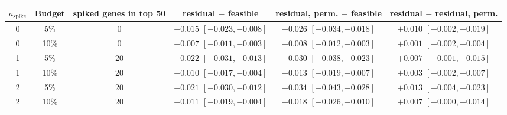 \begin{tabular}{cccccc}
\toprule
$a_{\mathrm{spike}}$ & Budget & spiked genes in top 50 & residual $-$ feasible & residual, perm. $-$ feasible & residual $-$ residual, perm. \\
\midrule
0 & 5\% & 0 & $-0.015$ $[-0.023, -0.008]$ & $-0.026$ $[-0.034, -0.018]$ & ${+}0.010$ $[{+}0.002, {+}0.019]$ \\
0 & 10\% & 0 & $-0.007$ $[-0.011, -0.003]$ & $-0.008$ $[-0.012, -0.003]$ & ${+}0.001$ $[-0.002, {+}0.004]$ \\
1 & 5\% & 20 & $-0.022$ $[-0.031, -0.013]$ & $-0.030$ $[-0.038, -0.023]$ & ${+}0.007$ $[-0.001, {+}0.015]$ \\
1 & 10\% & 20 & $-0.010$ $[-0.017, -0.004]$ & $-0.013$ $[-0.019, -0.007]$ & ${+}0.003$ $[-0.002, {+}0.007]$ \\
2 & 5\% & 20 & $-0.021$ $[-0.030, -0.012]$ & $-0.034$ $[-0.043, -0.028]$ & ${+}0.013$ $[{+}0.004, {+}0.023]$ \\
2 & 10\% & 20 & $-0.011$ $[-0.019, -0.004]$ & $-0.018$ $[-0.026, -0.010]$ & ${+}0.007$ $[-0.000, {+}0.014]$ \\
\bottomrule
\end{tabular}